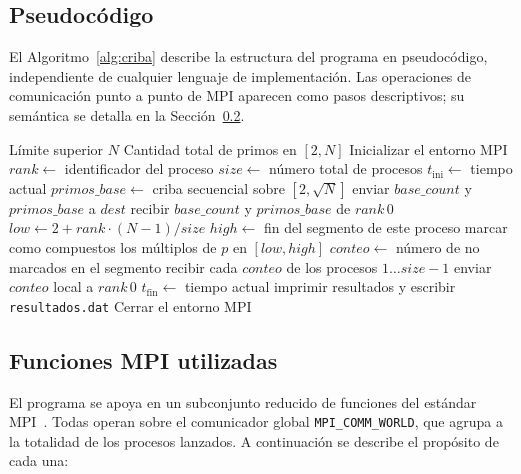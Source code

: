 \documentclass[conference]{IEEEtran}
\begin{document}
\subsection{Pseudocódigo}

El Algoritmo~\ref{alg:criba} describe la estructura del programa en
pseudocódigo, independiente de cualquier lenguaje de implementación. Las
operaciones de comunicación punto a punto de MPI aparecen como pasos
descriptivos; su semántica se detalla en la Sección~\ref{sec:funciones_mpi}.

\begin{algorithm}[h]
\caption{Criba de Eratóstenes distribuida con MPI}
\label{alg:criba}
\begin{algorithmic}[1]
\REQUIRE Límite superior $N$
\ENSURE Cantidad total de primos en $[2, N]$
\STATE Inicializar el entorno MPI 
\STATE $rank \gets$ identificador del proceso 
\STATE $size \gets$ número total de procesos 
\STATE $t_{\text{ini}} \gets$ tiempo actual 
\STATE
{}
  \STATE $primos\_base \gets$ criba secuencial sobre $[2, \sqrt{N}]$
    \STATE enviar $base\_count$ y $primos\_base$ a $dest$ 
  \ENDFOR
\ELSE
  \STATE recibir $base\_count$ y $primos\_base$ de $rank\,0$ 
\ENDIF
\STATE
\STATE $low \gets 2 + rank \cdot (N-1) / size$
\STATE $high \gets$ fin del segmento de este proceso
  \STATE marcar como compuestos los múltiplos de $p$ en $[low, high]$
\ENDFOR
\STATE $conteo \gets$ número de no marcados en el segmento
\STATE
{}
  \STATE recibir cada $conteo$ de los procesos $1\dots size-1$ 
\ELSE
  \STATE enviar $conteo$ local a $rank\,0$ 
\ENDIF
\STATE $t_{\text{fin}} \gets$ tiempo actual 
  \STATE imprimir resultados y escribir \texttt{resultados.dat}
\ENDIF
\STATE Cerrar el entorno MPI 
\end{algorithmic}
\end{algorithm}

\subsection{Funciones MPI utilizadas}
\label{sec:funciones_mpi}

El programa se apoya en un subconjunto reducido de funciones del estándar
MPI~\cite{gropp1999,mpiforum2021}. Todas operan sobre el comunicador global
\texttt{MPI\_COMM\_WORLD}, que agrupa a la totalidad de los procesos lanzados.
A continuación se describe el propósito de cada una:
\end{document}
